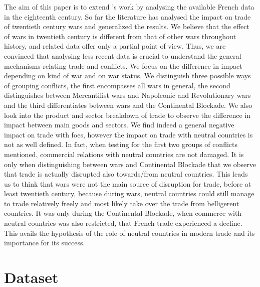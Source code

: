 \documentclass[12pt,a4paper,notitlepage,english]{article}
\begin{document}
The aim of this paper is to extend \cite{riley_seven_1986}’s work by analysing the available French data in the eighteenth century. So far the literature has analysed the impact on trade of twentieth century wars and generalized the results. We believe that the effect of wars in twentieth century is different from that of other wars throughout history, and related data offer only a partial point of view. Thus, we are convinced that analysing less recent data is crucial to understand the general mechanisms relating trade and conflicts. We focus on the difference in impact depending on kind of war and on war status. We distinguish three possible ways of grouping conflicts, the first encompasses all wars in general, the second distinguishes between Mercantilist wars and Napoleonic and Revolutionary wars and the third differentiates between wars and the Continental Blockade. We also look into the product and sector breakdown of trade to observe the difference in impact between main goods and sectors. We find indeed a general negative impact on trade with foes, however the impact on trade with neutral countries is not as well defined. In fact, when testing for the first two groups of conflicts mentioned, commercial relations with neutral countries are not damaged. It is only when distinguishing between wars and Continental Blockade that we observe that trade is actually disrupted also towards/from neutral countries. This leads us to think that wars were not the main source of disruption for trade, before at least twentieth century, because during wars, neutral countries could still manage to trade relatively freely and most likely take over the trade from belligerent countries. It was only during the Continental Blockade, when commerce with neutral countries was also restricted, that French trade experienced a decline. This avails the hypothesis of the role of neutral countries in modern trade and its importance for its success. 

\section{Dataset}
\end{document}
